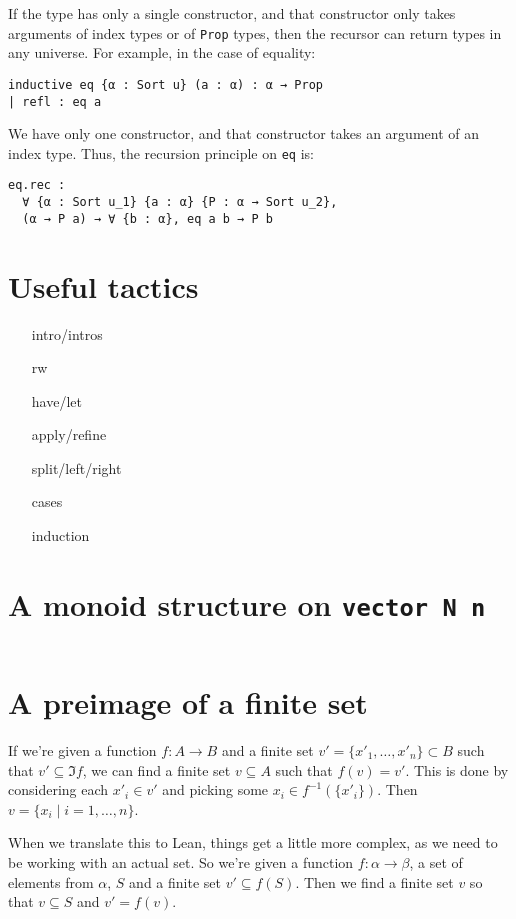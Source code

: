 \documentclass[a4paper, 12pt]{article}
\newcommand{\lean}[1]{\texttt{#1}}
\theoremstyle{changedot}
\theoremstyle{changedotbreak}
\theoremstyle{nonumberplain}
\begin{document}
If the type has only a single constructor, and that constructor only takes arguments of index types or of \lean{Prop} types, then the recursor can return types in any universe. For example, in the case of equality:

\begin{verbatim}
inductive eq {α : Sort u} (a : α) : α → Prop
| refl : eq a
\end{verbatim}

We have only one constructor, and that constructor takes an argument of an index type. Thus, the recursion principle on \lean{eq} is:
\begin{verbatim}
eq.rec :
  ∀ {α : Sort u_1} {a : α} {P : α → Sort u_2},
  (α → P a) → ∀ {b : α}, eq a b → P b
\end{verbatim}


\section{Useful tactics}
\begin{itemize}
  \item[intro/intros]
  \item[rw]
  \item[have/let]
  \item[apply/refine]
  \item[split/left/right]
  \item[cases]
  \item[induction]
\end{itemize}

\section{A monoid structure on \lean{vector N n}}\label{lean:vector_add_monoid}
\inputminted{lean}{../src/vector_add_monoid.lean}

\section{A preimage of a finite set}\label{lean:single_preimage}

If we're given a function $f : A \to B$ and a finite set $v' = \{x'_{1}, \dots, x'_{n}\} \subset B$ such that $v' \subseteq \Im f$, we can find a finite set $v \subseteq A$ such that $f(v) = v'$. This is done by considering each $x'_{i} \in v'$ and picking some $x_{i} \in f^{-1}(\{x'_{i}\})$. Then $v = \{x_{i} \mid i = 1, \dots, n\}$.

When we translate this to Lean, things get a little more complex, as we need to be working with an actual set. So we're given a function $f : \alpha \to \beta$, a set of elements from $\alpha$, $S$ and a finite set $v' \subseteq f(S)$. Then we find a finite set $v$ so that $v \subseteq S$ and $v' = f(v)$.

\inputminted[firstline=14, lastline=63]{lean}{../src/dickson.lean}
\end{document}
